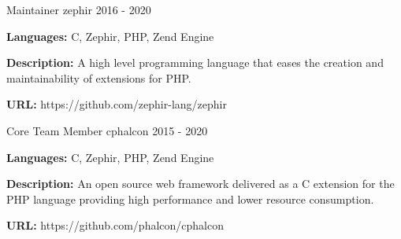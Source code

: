 \begin{cventries}
  \cventry
    {Maintainer}
    {zephir}
    {}
    {2016 - 2020}
    {
      \begin{cvitems}
        \item {\textbf{Languages:} C, Zephir, PHP, Zend Engine}
        \item {\textbf{Description:} A high level programming language that eases the creation and maintainability of extensions for PHP.}
        \item {\textbf{URL:} https://github.com/zephir-lang/zephir}
      \end{cvitems}
    }

  \cventry
    {Core Team Member}
    {cphalcon}
    {}
    {2015 - 2020}
    {
      \begin{cvitems}
        \item {\textbf{Languages:} C, Zephir, PHP, Zend Engine}
        \item {\textbf{Description:} An open source web framework delivered as a C extension for the PHP language providing high performance and lower resource consumption.}
        \item {\textbf{URL:} https://github.com/phalcon/cphalcon}
      \end{cvitems}
    }

\end{cventries}
